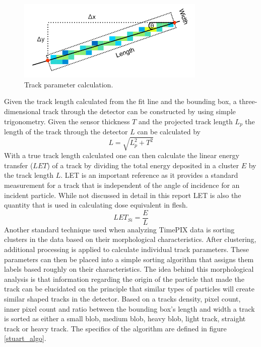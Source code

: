 \begin{figure}[H]
	\begin{center}
	\includegraphics[width=0.8\textwidth]{figures/density.png}
	\caption{Track parameter calculation.\cite{stuartthesis}}
	\label{track_analysis}
	\end{center}
\end{figure}

Given the track length calculated from the fit line and the bounding box, a three-dimensional track through the detector can be constructed by using simple trigonometry. Given the sensor thickness $T$ and the projected track length $L_{p}$ the length of the track through the detector $L$ can be calculated by
%
\[L = \sqrt{L_{p}^{2} + T^{2}} \]
%
\newpage
With a true track length calculated one can then calculate the linear energy transfer ($LET$) of a track by dividing the total energy deposited in a cluster $E$ by the track length $L$. LET is an important reference as it provides a standard measurement for a track that is independent of the angle of incidence for an incident particle. While not discussed in detail in this report LET is also the quantity that is used in calculating dose equivalent in flesh.
%
\[LET_{Si} = \frac{E}{L}\]
%
Another standard technique used when analyzing TimePIX data is sorting clusters in the data based on their morphological characteristics. After clustering, additional processing is applied to calculate individual track parameters. These parameters can then be placed into a simple sorting algorithm that assigns them labels based roughly on their characteristics. The idea behind this morphological analysis is that information regarding the origin of the particle that made the track can be elucidated on the principle that similar types of particles will create similar shaped tracks in the detector. Based on a tracks density, pixel count, inner pixel count and ratio between the bounding box's length and width a track is sorted as either a small blob, medium blob, heavy blob, light track, straight track or heavy track. The specifics of the algorithm are defined in figure \ref{stuart_algo}.

